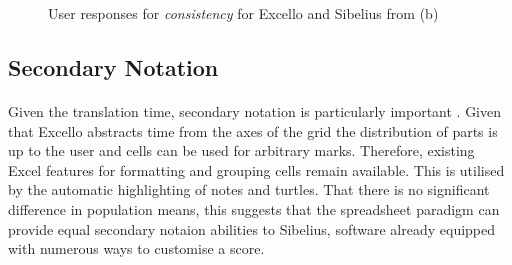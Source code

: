 \begin{figure}[htb]
\caption{User responses for \textit{consistency} for Excello and Sibelius from (b)}
\label{evaluation:cons}
\end{figure}

\subsection{Secondary Notation}

\paragraph{} Given the translation time, secondary notation is particularly important \cite{blackwell:notation}. Given that Excello abstracts time from the axes of the grid the distribution of parts is up to the user and cells can be used for arbitrary marks. Therefore, existing Excel features for formatting and grouping cells remain available. This is utilised by the automatic highlighting of notes and turtles. That there is no significant difference in population means, this suggests that the spreadsheet paradigm can provide equal secondary notaion abilities to Sibelius, software already equipped with numerous ways to customise a score.

